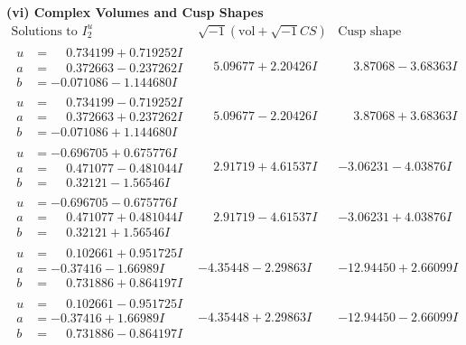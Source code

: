 \documentclass[1p]{elsarticle_modified}
\theoremstyle{definition}
\newcommand{\I}{\sqrt{-1}}
\begin{document}
\newpage\flushleft \textbf{(vi) Complex Volumes and Cusp Shapes}
$$\begin{array}{c|c|c}  
\text{Solutions to }I^u_{2}& \I (\text{vol} + \sqrt{-1}CS) & \text{Cusp shape}\\
 \hline 
\begin{aligned}
u &= \phantom{-}0.734199 + 0.719252 I \\
a &= \phantom{-}0.372663 - 0.237262 I \\
b &= -0.071086 - 1.144680 I\end{aligned}
 & \phantom{-}5.09677 + 2.20426 I & \phantom{-}3.87068 - 3.68363 I \\ \hline\begin{aligned}
u &= \phantom{-}0.734199 - 0.719252 I \\
a &= \phantom{-}0.372663 + 0.237262 I \\
b &= -0.071086 + 1.144680 I\end{aligned}
 & \phantom{-}5.09677 - 2.20426 I & \phantom{-}3.87068 + 3.68363 I \\ \hline\begin{aligned}
u &= -0.696705 + 0.675776 I \\
a &= \phantom{-}0.471077 - 0.481044 I \\
b &= \phantom{-}0.32121 - 1.56546 I\end{aligned}
 & \phantom{-}2.91719 + 4.61537 I & -3.06231 - 4.03876 I \\ \hline\begin{aligned}
u &= -0.696705 - 0.675776 I \\
a &= \phantom{-}0.471077 + 0.481044 I \\
b &= \phantom{-}0.32121 + 1.56546 I\end{aligned}
 & \phantom{-}2.91719 - 4.61537 I & -3.06231 + 4.03876 I \\ \hline\begin{aligned}
u &= \phantom{-}0.102661 + 0.951725 I \\
a &= -0.37416 - 1.66989 I \\
b &= \phantom{-}0.731886 + 0.864197 I\end{aligned}
 & -4.35448 - 2.29863 I & -12.94450 + 2.66099 I \\ \hline\begin{aligned}
u &= \phantom{-}0.102661 - 0.951725 I \\
a &= -0.37416 + 1.66989 I \\
b &= \phantom{-}0.731886 - 0.864197 I\end{aligned}
 & -4.35448 + 2.29863 I & -12.94450 - 2.66099 I \\ \hline\begin{aligned}

\end{aligned}
\end{array}$$
\end{document}
